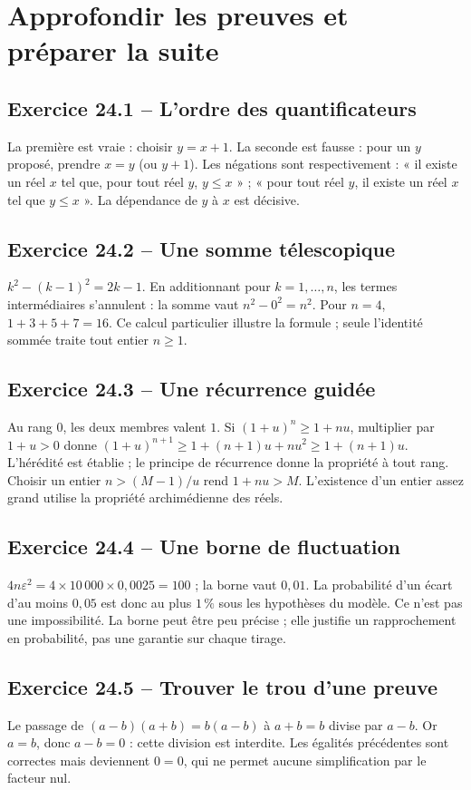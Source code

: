 \chapter{Approfondir les preuves et préparer la suite}
\section*{Exercice 24.1 -- L'ordre des quantificateurs}
La première est vraie : choisir $y=x+1$. La seconde est fausse : pour un $y$ proposé, prendre $x=y$ (ou $y+1$). Les négations sont respectivement : « il existe un réel $x$ tel que, pour tout réel $y$, $y\le x$ » ; « pour tout réel $y$, il existe un réel $x$ tel que $y\le x$ ». La dépendance de $y$ à $x$ est décisive.

\section*{Exercice 24.2 -- Une somme télescopique}
$k^2-(k-1)^2=2k-1$. En additionnant pour $k=1,\ldots,n$, les termes intermédiaires s'annulent : la somme vaut $n^2-0^2=n^2$. Pour $n=4$, $1+3+5+7=16$. Ce calcul particulier illustre la formule ; seule l'identité sommée traite tout entier $n\ge1$.

\section*{Exercice 24.3 -- Une récurrence guidée}
Au rang $0$, les deux membres valent $1$. Si $(1+u)^n\ge1+nu$, multiplier par $1+u>0$ donne $(1+u)^{n+1}\ge1+(n+1)u+nu^2\ge1+(n+1)u$. L'hérédité est établie ; le principe de récurrence donne la propriété à tout rang. Choisir un entier $n>(M-1)/u$ rend $1+nu>M$. L'existence d'un entier assez grand utilise la propriété archimédienne des réels.

\section*{Exercice 24.4 -- Une borne de fluctuation}
$4n\varepsilon^2=4\times10\,000\times0{,}0025=100$ ; la borne vaut $0{,}01$. La probabilité d'un écart d'au moins $0{,}05$ est donc au plus $1\,\%$ sous les hypothèses du modèle. Ce n'est pas une impossibilité. La borne peut être peu précise ; elle justifie un rapprochement en probabilité, pas une garantie sur chaque tirage.

\section*{Exercice 24.5 -- Trouver le trou d'une preuve}
Le passage de $(a-b)(a+b)=b(a-b)$ à $a+b=b$ divise par $a-b$. Or $a=b$, donc $a-b=0$ : cette division est interdite. Les égalités précédentes sont correctes mais deviennent $0=0$, qui ne permet aucune simplification par le facteur nul.

